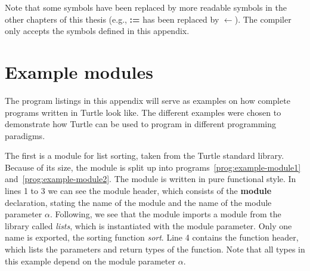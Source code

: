 \begin{appendix}
\begin{grammar}











\end{grammar}

\noindent
Note that some symbols have been replaced by more readable symbols in
the other chapters of this thesis (e.g., {\bf :=} has been replaced by
$\leftarrow$).  The compiler only accepts the symbols defined in this
appendix.

\chapter{Example modules}
\label{cha:example-modules}

The program listings in this appendix will serve as examples on how
complete programs written in Turtle look like.  The different examples
were chosen to demonstrate how Turtle can be used to program in
different programming paradigms.

The first is a module for list sorting, taken from the Turtle standard
library.  Because of its size, the module is split up into
programs~\ref{prog:example-module1} and~\ref{prog:example-module2}.
The module is written in pure functional style.  In lines 1 to 3 we
can see the module header, which consists of the {\bf module}
declaration, stating the name of the module and the name of the module
parameter $\alpha$.  Following, we see that the module imports a
module from the library called {\em lists}, which is instantiated with
the module parameter.  Only one name is exported, the sorting function
{\em sort}.  Line 4 contains the function header, which lists the
parameters and return types of the function.  Note that all types in
this example depend on the module parameter $\alpha$.


\end{appendix}
